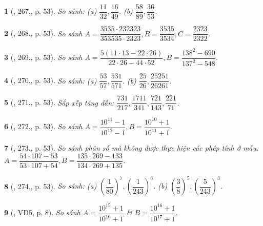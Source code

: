 \documentclass{article}
\newtheorem{baitoan}{}
\begin{document}
\begin{baitoan}[\cite{Tuyen_Toan_6}, 267., p. 53]
	So sánh: (a) $\dfrac{11}{32},\dfrac{16}{49}$. (b) $\dfrac{58}{89},\dfrac{36}{53}$.
\end{baitoan}

\begin{baitoan}[\cite{Tuyen_Toan_6}, 268., p. 53]
	So sánh $A = \dfrac{3535\cdot232323}{353535\cdot2323},B = \dfrac{3535}{3534},C = \dfrac{2323}{2322}$.
\end{baitoan}

\begin{baitoan}[\cite{Tuyen_Toan_6}, 269., p. 53]
	So sánh $A = \dfrac{5(11\cdot13 - 22\cdot26)}{22\cdot26 - 44\cdot52},B = \dfrac{138^2 - 690}{137^2 - 548}$.
\end{baitoan}

\begin{baitoan}[\cite{Tuyen_Toan_6}, 270., p. 53]
	So sánh: (a) $\dfrac{53}{57},\dfrac{531}{571}$. (b) $\dfrac{25}{26},\dfrac{25251}{26261}$.
\end{baitoan}

\begin{baitoan}[\cite{Tuyen_Toan_6}, 271., p. 53]
	Sắp xếp tăng dần: $\dfrac{731}{217},\dfrac{1711}{341},\dfrac{721}{143},\dfrac{221}{71}$.
\end{baitoan}

\begin{baitoan}[\cite{Tuyen_Toan_6}, 272., p. 53]
	So sánh $A = \dfrac{10^{11} - 1}{10^{12} - 1},B = \dfrac{10^{10} + 1}{10^{11} + 1}$.
\end{baitoan}

\begin{baitoan}[\cite{Tuyen_Toan_6}, 273., p. 53]
	So sánh phân số mà không được thực hiện các phép tính ở mẫu: $A = \dfrac{54\cdot107 - 53}{53\cdot107 + 54},B = \dfrac{135\cdot269 - 133}{134\cdot269 + 135}$.
\end{baitoan}

\begin{baitoan}[\cite{Tuyen_Toan_6}, 274., p. 53]
	So sánh: (a) $\left(\dfrac{1}{80}\right)^7,\left(\dfrac{1}{243}\right)^6$. (b) $\left(\dfrac{3}{8}\right)^5,\left(\dfrac{5}{243}\right)^3$.
\end{baitoan}

\begin{baitoan}[\cite{Binh_Toan_6_tap_2}, VD5, p. 8]
	So sánh $A = \dfrac{10^{15} + 1}{10^{16} + 1}$ \& $B = \dfrac{10^{16} + 1}{10^{17} + 1}$.
\end{baitoan}
\end{document}
